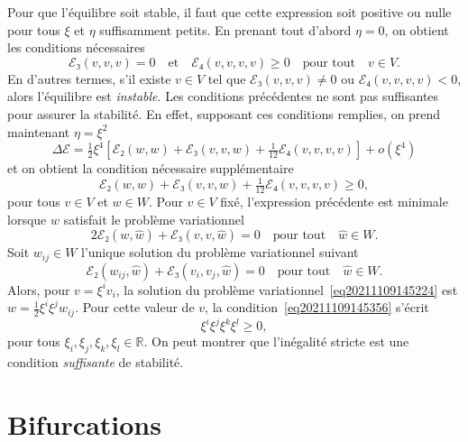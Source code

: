 \documentclass[12pt, final]{amsart}
\theoremstyle{definition}
\begin{document}
Pour que l'équilibre soit stable, il faut que cette expression soit positive ou nulle pour tous \(ξ\) et \(η\) suffisamment petits. En prenant tout d'abord \(η = 0\), on obtient les conditions nécessaires \begin{equation}
 \label{eq20211108164416} ℰ₃(v, v, v) = 0 \quad \text{et} \quad
 ℰ₄(v, v, v, v) \geq 0 \quad \text{pour tout} \quad v∈V.
\end{equation}
En d'autres termes, s'il existe \(v∈V\) tel que \(ℰ₃(v, v, v) \neq 0\) ou \(ℰ₄(v, v, v, v) < 0\), alors l'équilibre est \emph{instable}. Les conditions précédentes ne sont pas suffisantes pour assurer la stabilité. En effet, supposant ces conditions remplies, on prend maintenant \(η = ξ^2\)
\begin{equation}
 \Delta ℰ= \tfrac{1}{2} ξ^4 \left[ ℰ₂(w, w)
 +ℰ₃(v, v, w) + \tfrac{1}{12} ℰ₄(v, v, v, v) \right]
 + o(ξ^4)
\end{equation}
et on obtient la condition nécessaire supplémentaire
\begin{equation}
 \label{eq20211109145356} ℰ₂(w, w) +ℰ₃(v, v, w) +
 \tfrac{1}{12} ℰ₄(v, v, v, v) \geq 0,
\end{equation}
pour tous \(v∈V\) et \(w∈W\). Pour \(v∈V\) fixé, l'expression précédente est minimale lorsque \(w\) satisfait le problème variationnel
\begin{equation}
 \label{eq20211109145224} 2ℰ₂(w, \hat{w}) +ℰ₃(v, v,
 \hat{w}) = 0 \quad \text{pour tout} \quad \hat{w}∈W.
\end{equation}
Soit \(w_{i j}∈W\) l'unique solution du problème variationnel suivant
\begin{equation}
 \label{eq:pbvar wij} ℰ₂(w_{i j}, \hat{w})
 +ℰ₃(v_i, v_j, \hat{w}) = 0 \quad \text{pour tout} \quad \hat{w}
 ∈W.
\end{equation}
Alors, pour \(v = ξ^i v_i\), la solution du problème variationnel~\eqref{eq20211109145224} est \(w = \tfrac{1}{2} ξ^i ξ^j w_{ij}\). Pour cette valeur de \(v\), la condition~\eqref{eq20211109145356} s'écrit
\begin{equation}
 [ℰ₄(v_i, v_j, v_k, v_l) - 3ℰ₂(w_{i j}, w_{k
  l})] ξ^i ξ^j ξ^k ξ^l \geq 0,
\end{equation}
pour tous \(ξ_i, ξ_j, ξ_k, ξ_l∈\mathbb{R}\). On peut montrer que l'inégalité stricte est une condition \emph{suffisante} de stabilité.

\section{Bifurcations}
\end{document}
